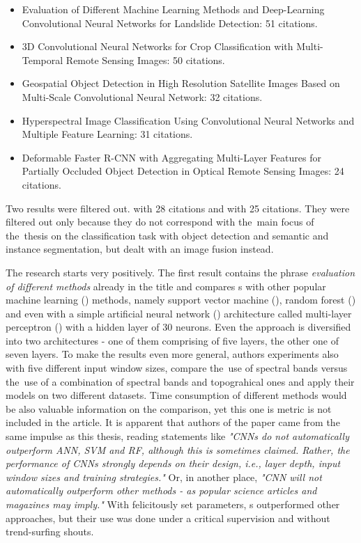 \begin{itemize}
	\item Evaluation of Different Machine Learning Methods and Deep-Learning Convolutional Neural Networks for Landslide Detection: 51 citations.  \cite{landslide-evaluation}
	\item 3D Convolutional Neural Networks for Crop Classification with Multi-Temporal Remote Sensing Images: 50 citations. \cite{3d-cnn-crop}
	\item Geospatial Object Detection in High Resolution Satellite Images Based on Multi-Scale Convolutional Neural Network: 32 citations. \cite{object-detection-hrs-multi-scale}
	\item Hyperspectral Image Classification Using Convolutional Neural Networks and Multiple Feature Learning: 31 citations. \cite{hyperspectral-multiple-feat-cnn}
	\item Deformable Faster R-CNN with Aggregating Multi-Layer Features for Partially Occluded Object Detection in Optical Remote Sensing Images: 24 citations. \cite{deformable-faster-r-cnn}
\end{itemize}

Two results were filtered out. \cite{cnn-fusion-clouds} with 28 citations and \cite{cnn-fusion-hr-hsr} with 25 citations. They were filtered out only because they do not correspond with the~main focus of the~thesis on the classification task with object detection and semantic and instance segmentation, but dealt with an image fusion instead. 

The research starts very positively. The first result contains the phrase \textit{evaluation of different methods} already in the title and compares s with other popular machine learning () methods, namely support vector machine (), random forest () and even with a simple artificial neural network () architecture called multi-layer perceptron () with a hidden layer of 30 neurons. Even the  approach is diversified into two architectures - one of them comprising of five layers, the other one of seven layers. To make the results even more general, authors experiments also with five different input window sizes, compare the~use of spectral bands versus the~use of a combination of spectral bands and topograhical ones and apply their models on two different datasets. Time consumption of different methods would be also valuable information on the comparison, yet this one is metric is not included in the article. It is apparent that authors of the paper came from the same impulse as this thesis, reading statements like \textit{"CNNs do not automatically outperform ANN, SVM and RF, although this is sometimes claimed. Rather, the performance of CNNs strongly depends on their design, i.e., layer depth, input window sizes and training strategies."} Or, in another place, \textit{"CNN will not automatically outperform other methods - as popular science articles and magazines may imply."} With felicitously set parameters, s outperformed other approaches, but their use was done under a critical supervision and without trend-surfing shouts.

